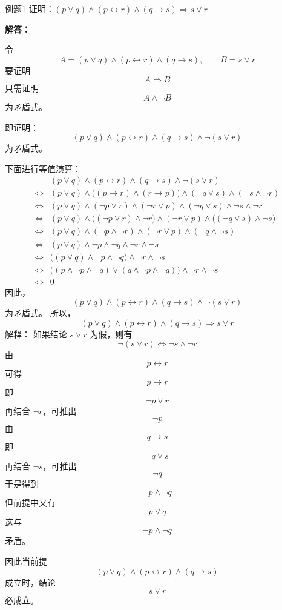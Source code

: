 \begin{question}{例题1}
证明：\((p \vee q) \land (p \leftrightarrow r) \land (q \rightarrow s) \Rightarrow s \vee r\)

\textbf{解答：}

令
\[
A=(p \vee q) \land (p \leftrightarrow r) \land (q \rightarrow s),
\qquad
B=s\vee r
\]
要证明
\[
A\Rightarrow B
\]
只需证明
\[
A\land \neg B
\]
为矛盾式。

即证明：
\[
(p \vee q) \land (p \leftrightarrow r) \land (q \rightarrow s)\land \neg(s\vee r)
\]
为矛盾式。

下面进行等值演算：
\begin{align*}
	& (p \vee q) \land (p \leftrightarrow r) \land (q \rightarrow s)\land \neg(s\vee r) \\
	\Leftrightarrow{}&
	(p \vee q) \land \bigl((p\rightarrow r)\land(r\rightarrow p)\bigr)
	\land (\neg q\vee s)\land(\neg s\land \neg r) \\
	\Leftrightarrow{}&
	(p \vee q) \land (\neg p\vee r)\land(\neg r\vee p)
	\land(\neg q\vee s)\land\neg s\land \neg r \\
	\Leftrightarrow{}&
	(p \vee q) \land \bigl((\neg p\vee r)\land \neg r\bigr)
	\land(\neg r\vee p)
	\land\bigl((\neg q\vee s)\land\neg s\bigr) \\
	\Leftrightarrow{}&
	(p \vee q) \land (\neg p\land \neg r)
	\land(\neg r\vee p)
	\land(\neg q\land \neg s) \\
	\Leftrightarrow{}&
	(p \vee q)\land \neg p\land \neg q\land \neg r\land \neg s \\
	\Leftrightarrow{}&
	\bigl((p\vee q)\land \neg p\land \neg q\bigr)
	\land \neg r\land \neg s \\
	\Leftrightarrow{}&
	\bigl((p\land \neg p\land \neg q)\vee(q\land \neg p\land \neg q)\bigr)
	\land \neg r\land \neg s \\
	\Leftrightarrow{}&
	0
\end{align*}
因此，
\[
(p \vee q) \land (p \leftrightarrow r) \land (q \rightarrow s)\land \neg(s\vee r)
\]
为矛盾式。
所以，
\[
(p \vee q) \land (p \leftrightarrow r) \land (q \rightarrow s) \Rightarrow s \vee r
\]
解释：
如果结论 \(s\vee r\) 为假，则有
\[
\neg(s\vee r)\Leftrightarrow \neg s\land \neg r
\]
由
\[
p\leftrightarrow r
\]
可得
\[
p\rightarrow r
\]
即
\[
\neg p\vee r
\]
再结合 \(\neg r\)，可推出
\[
\neg p
\]
由
\[
q\rightarrow s
\]
即
\[
\neg q\vee s
\]
再结合 \(\neg s\)，可推出
\[
\neg q
\]
于是得到
\[
\neg p\land \neg q
\]
但前提中又有
\[
p\vee q
\]
这与
\[
\neg p\land \neg q
\]
矛盾。

因此当前提
\[
(p \vee q) \land (p \leftrightarrow r) \land (q \rightarrow s)
\]
成立时，结论
\[
s\vee r
\]
必成立。


\end{question}


